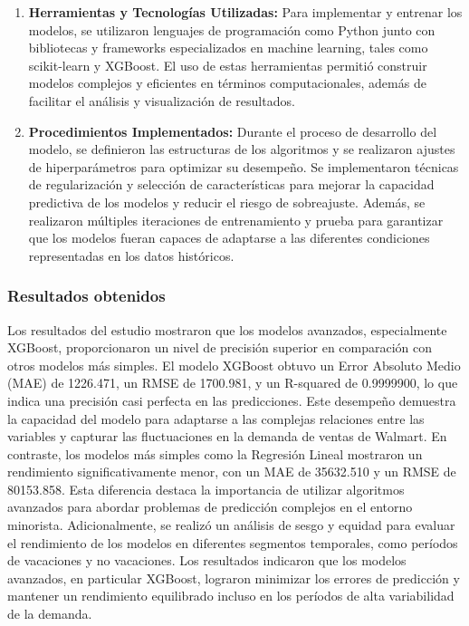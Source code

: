 \begin{enumerate}
\begin{itemize}
	\end{itemize}
	\item \textbf{Herramientas y Tecnologías Utilizadas:} Para implementar y entrenar los modelos, se utilizaron lenguajes de programación como Python junto con bibliotecas y frameworks especializados en machine learning, tales como scikit-learn y XGBoost. El uso de estas herramientas permitió construir modelos complejos y eficientes en términos computacionales, además de facilitar el análisis y visualización de resultados.
	\item \textbf{Procedimientos Implementados:} Durante el proceso de desarrollo del modelo, se definieron las estructuras de los algoritmos y se realizaron ajustes de hiperparámetros para optimizar su desempeño. Se implementaron técnicas de regularización y selección de características para mejorar la capacidad predictiva de los modelos y reducir el riesgo de sobreajuste. Además, se realizaron múltiples iteraciones de entrenamiento y prueba para garantizar que los modelos fueran capaces de adaptarse a las diferentes condiciones representadas en los datos históricos.
\end{enumerate}

\subsubsection{Resultados obtenidos}
Los resultados del estudio mostraron que los modelos avanzados, especialmente XGBoost, proporcionaron un nivel de precisión superior en comparación con otros modelos más simples. El modelo XGBoost obtuvo un Error Absoluto Medio (MAE) de 1226.471, un RMSE de 1700.981, y un R-squared de 0.9999900, lo que indica una precisión casi perfecta en las predicciones. Este desempeño demuestra la capacidad del modelo para adaptarse a las complejas relaciones entre las variables y capturar las fluctuaciones en la demanda de ventas de Walmart.
En contraste, los modelos más simples como la Regresión Lineal mostraron un rendimiento significativamente menor, con un MAE de 35632.510 y un RMSE de 80153.858. Esta diferencia destaca la importancia de utilizar algoritmos avanzados para abordar problemas de predicción complejos en el entorno minorista.
Adicionalmente, se realizó un análisis de sesgo y equidad para evaluar el rendimiento de los modelos en diferentes segmentos temporales, como períodos de vacaciones y no vacaciones. Los resultados indicaron que los modelos avanzados, en particular XGBoost, lograron minimizar los errores de predicción y mantener un rendimiento equilibrado incluso en los períodos de alta variabilidad de la demanda.

